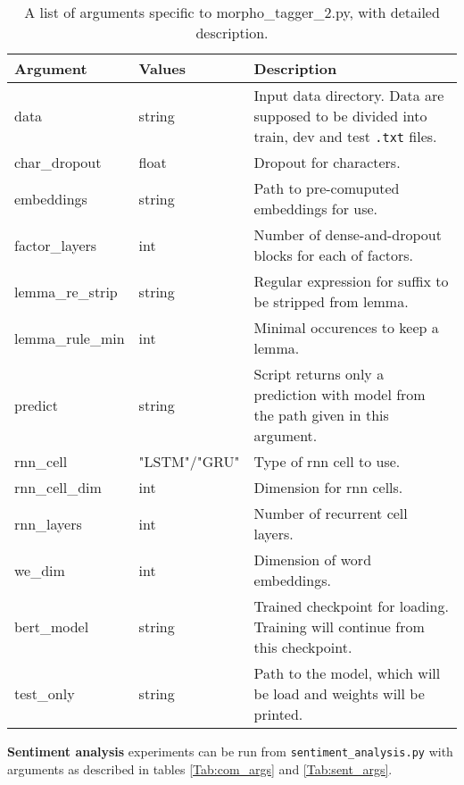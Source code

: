 \begin{table}
\centering
\label{Tab:mt2_args}
\begin{tabular}{ |p{3cm}|p{}|p{6cm}| } 
 \hline
 Argument & Values & Description \\ 
 \hline \hline
 data & string &  Input data directory. Data are supposed to be divided into train, dev and test \texttt{.txt} files. \\ \hline
 char\_dropout &  float &  Dropout for characters. \\ \hline
embeddings & string & Path to pre-comuputed embeddings for use. \\ \hline
factor\_layers & int & Number of dense-and-dropout blocks for each of factors.  \\ \hline
lemma\_re\_strip &  string & Regular expression for suffix to be stripped from lemma. \\ \hline
lemma\_rule\_min & int & Minimal occurences to keep a lemma.  \\ \hline
predict & string & Script returns only a prediction with model from the path given in this argument.  \\ \hline
rnn\_cell & "LSTM"/"GRU" & Type of rnn cell to use. \\ \hline
rnn\_cell\_dim & int & Dimension for rnn cells.  \\ \hline
rnn\_layers& int & Number of recurrent cell layers.  \\ \hline
we\_dim & int & Dimension of word embeddings.  \\ \hline  


bert\_model & string & Trained checkpoint for loading. Training will continue from this checkpoint. \\ \hline

test\_only & string & Path to the model, which will be load and weights will be printed.  \\ \hline
 \hline
\end{tabular}
\caption{A list of arguments specific to morpho\_tagger\_2.py, with detailed description.} 
\end{table}

\textbf{Sentiment analysis} experiments can be run from \texttt{sentiment\_analysis.py} with arguments as described in tables \ref{Tab:com_args} and \ref{Tab:sent_args}.

